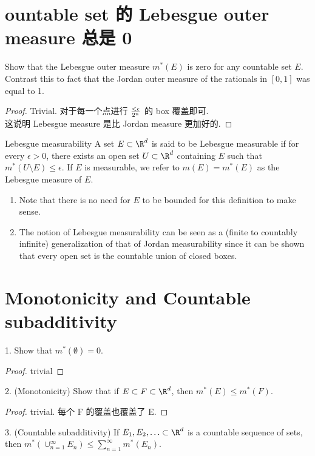 \documentclass[lang=cn,11pt]{template}
\begin{document}
\section{ountable set 的 Lebesgue outer measure 总是 0}
Show that the Lebesgue outer measure $m^*(E)$ is zero for any countable set $E$. Contrast this to fact that the Jordan outer measure of the rationals in $[0,1]$ was equal to 1.
\begin{proof}
    Trivial. 对于每一个点进行 $ < \epsilon \over {2^n}$ 的 box 覆盖即可. \\
    这说明 Lebesgue measure 是比 Jordan measure 更加好的.
\end{proof}


\begin{definition}{Lebesgue measurability}
A set $E\subset \R^d$ is said to be Lebesgue measurable if for every $\epsilon>0$, there exists an open set $U\subset \R^d$ containing $E$ such that $m^*(U\setminus E)\leq \epsilon$. If $E$ is measurable, we refer to $m(E)=m^*(E)$ as the Lebesgue measure of $E$. 
\end{definition}

\begin{remark}
    \begin{enumerate} 
\item Note that there is no need for $E$ to be bounded for this definition to make sense. 
\item The notion of Lebesgue measurability can be seen as a (finite to countably infinite) generalization of that of Jordan measurability since it can be shown that every open set is the countable union of closed boxes.  
\end{enumerate}
\end{remark}


\section{Monotonicity and Countable subadditivity}
1. Show that $m^*(\emptyset)=0$.
\begin{proof}
    trivial
\end{proof}
2. (Monotonicity) Show that if $E\subset F\subset \R^d$, then $m^*(E) \leq m^*(F)$.
\begin{proof}
    trivial. 每个 F 的覆盖也覆盖了 E.
\end{proof}
3. (Countable subadditivity) If $E_1, E_2, \ldots \subset \R^d$ is a countable sequence of sets, then $m^*\left(\cup_{n=1}^\infty E_n\right)\leq \sum_{n=1}^\infty m^*(E_n)$. 
\end{document}
